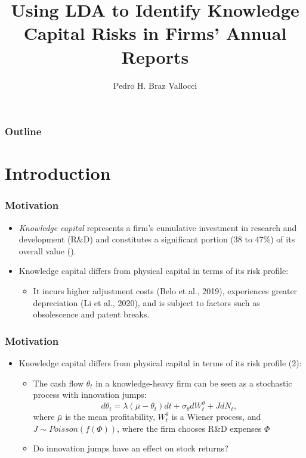 \documentclass{beamer}
\title[] %
{Using LDA to Identify Knowledge Capital Risks in Firms' Annual Reports}
\author[Pedro Vallocci] %
{Pedro H. Braz Vallocci\inst{1}}
\institute[UCSC] %
{
  \inst{1}%
  University of California, Santa Cruz
 }
\begin{document}
\frame{\titlepage}

\begin{frame}
\frametitle{Outline}
\tableofcontents
\end{frame}

\section{Introduction}
\begin{frame}
\frametitle{Motivation}
\begin{itemize}	
\item \textit{Knowledge capital} represents a firm's cumulative investment in research and development (R\&D) and constitutes a significant portion (38 to 47\%) of its overall value (\cite{Belo2019-iz}).
\item Knowledge capital differs from physical capital in terms of its risk profile:
\begin{itemize}
\item It incurs higher adjustment costs (Belo et al., 2019), experiences greater depreciation (Li et al., 2020), and is subject to factors such as obsolescence and patent breaks.
\end{itemize}
\end{itemize}
\end{frame}

\begin{frame}
\frametitle{Motivation}
\begin{itemize}	
\item Knowledge capital differs from physical capital in terms of its risk profile (2):
\begin{itemize}
\item The cash flow $\theta_t$ in a knowledge-heavy firm can be seen as a stochastic process with innovation jumps: \citep{Andrei2019-bh}  
\begin{equation}
	d \theta_t=\lambda\left(\bar{\mu}-\theta_t\right) d t+\sigma_\theta d W_t^\theta+J d N_t, 
\end{equation}
where $\bar{\mu}$ is the mean profitability, $W_t^\theta$ is a Wiener process, and $J \sim Poisson(f(\Phi))$, where the firm chooses R\&D expenses $\Phi$
\item Do innovation jumps have an effect on stock returns?
\end{itemize}
\end{itemize}
\end{frame}
\end{document}
